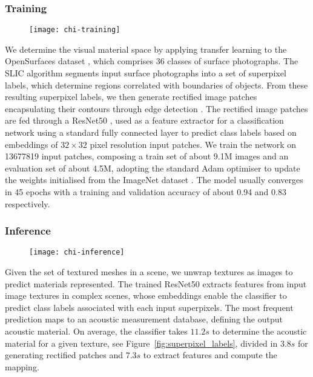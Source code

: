 \subsubsection{Training}
\begin{figure}[htbp]
    \centering
    \texttt{[image: chi-training]}
    \caption{}
    \label{fig:chi-inference}
\end{figure}
We determine the visual material space by applying transfer learning to the OpenSurfaces dataset \cite{bell2013opensurfaces}, which comprises 36 classes of surface photographs. 
The SLIC algorithm \cite{slic6205760} segments input surface photographs into a set of superpixel labels, which determine regions correlated with boundaries of objects. From these resulting superpixel labels, we then generate rectified image patches encapsulating their contours through edge detection \cite{ding2001canny}.
The rectified image patches are fed through a ResNet50 \cite{he2016deep}, used as a feature extractor for a classification network using a standard fully connected layer to predict class labels based on embeddings of $32\times32$ pixel resolution input patches. We train the network on 13677819 input patches, composing a train set of about 9.1M images and an evaluation set of about 4.5M, adopting the standard Adam optimiser \cite{kingma2014adam} to update the weights initialised from the ImageNet dataset \cite{deng2009imagenet}. The model usually converges in 45 epochs with a training and validation accuracy of about 0.94 and 0.83 respectively. 

\subsubsection{Inference}
\begin{figure}[htbp]
    \centering
    \texttt{[image: chi-inference]}
    \caption{}
    \label{fig:chi-inference}
\end{figure}
Given the set of textured meshes in a scene, we unwrap textures as images to predict materials represented. The trained ResNet50 extracts features from input image textures in complex scenes, whose embeddings enable the classifier to predict class labels associated with each input superpixels. The most frequent prediction maps to an acoustic measurement database, defining the output acoustic material. On average, the classifier takes $11.2s$ to determine the acoustic material for a given texture, see Figure~\ref{fig:superpixel_labels}, divided in $3.8s$ for generating rectified patches and $7.3s$ to extract features and compute the mapping.%


